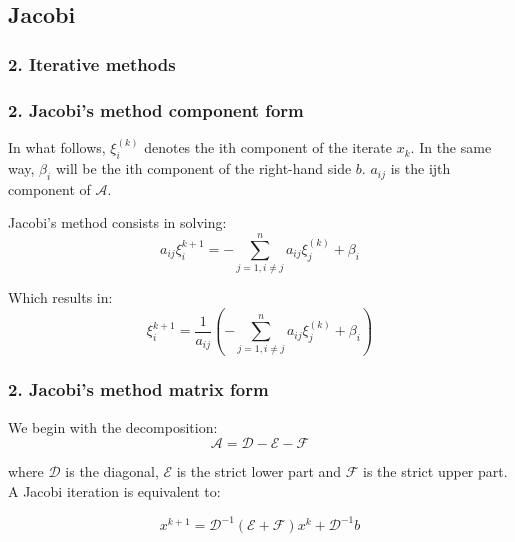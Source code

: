 \subsection{Jacobi}

\begin{frame}
		\frametitle{\textbf{2. Iterative methods}}
	
	
		
\end{frame}

\begin{frame} 
\frametitle{\textbf{2. Jacobi's method component form}}

In what follows, $\xi_i^{(k)}$ denotes the ith component of the iterate $x_k$. In the same way, $\beta_i$ will be the ith component of the right-hand side $b$. $a_{ij}$ is the ijth component of $\mathcal{A}$.

Jacobi's method consists in solving:
\[
a_{ij} \xi_i^{k+1} = - \sum_{j=1,i\neq j}^n a_{ij} \xi_j^{(k)} + \beta_i
\]

Which results in:
\[
 \xi_i^{k+1} = \frac{1}{a_{ij}} \left( - \sum_{j=1,i\neq j}^n a_{ij} \xi_j^{(k)} + \beta_i \right)
\]

\end{frame}

\begin{frame} 
	\frametitle{\textbf{2. Jacobi's method matrix form}}
	
	We begin with the decomposition:
	\[
	\mathcal{A} = \mathcal{D} - \mathcal{E}-\mathcal{F}
	\]
	
	where $\mathcal{D}$ is the diagonal, $\mathcal{E}$ is the strict lower part and $\mathcal{F}$ is the strict upper part. A Jacobi iteration is equivalent to:
	
	\[
	x^{k+1} = \mathcal{D}^{-1} (\mathcal{E} + \mathcal{F})x^{k} + \mathcal{D}^{-1} b
	\]
	
\end{frame}

